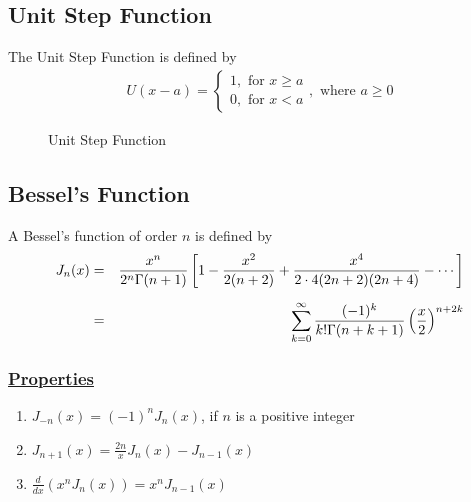 \documentclass[11pt]{report}
\newcommand{\ubt}[1]{\textbf{\underline{#1}}}
\newcommand{\sps}{\\[0.2cm]}
\newcommand{\dsp}{\displaystyle}
\newcommand{\properties}{\subsubsection{\ubt{Properties}}}
\renewcommand{\labelenumi}{\roman{enumi}.}
\begin{document}
	\subsection{Unit Step Function}
	The Unit Step Function is defined by
	\begin{eqnarray}
		U(x-a) = \left\{
			\begin{array}{l}
				1, \text{ for } x \geq a\\
				0, \text{ for } x < a
			\end{array}\right., \text{ where } a \geq 0 \label{eq:2_5}
	\end{eqnarray}
	
	\begin{figure}
		\centering
		\caption{Unit Step Function}\label{fig:2_1}
	\end{figure}

	\subsection{Bessel's Function}
	A Bessel's function of order $n$ is defined by
	\begin{eqnarray}
		J_n(x) &=& \frac{x^n}{2^n\Gamma(n+1)}\left[1 - \frac{x^2}{2(n+2)} + \frac{x^4}{2\cdot 4 (2n+2)(2n+4)} - \cdots \right]\notag\sps 
		&=& \sum_{k=0}^{\infty}\frac{(-1)^k}{k!\Gamma(n+k+1)}\left(\frac{x}{2}\right)^{n+2k} \label{eq:2_6}
	\end{eqnarray}
	
	\properties
	\begin{enumerate}
		\renewcommand{\labelenumi}{\roman{enumi}.}
		\item $\dsp J_{-n}(x) = (-1)^n J_n(x)$, if $n$ is a positive integer
		
		\item $\dsp J_{n+1}(x) = \frac{2n}{x}J_n(x) - J_{n-1}(x)$
		
		\item $\dsp \frac{d}{dx}\left(x^nJ_n(x)\right) = x^nJ_{n-1}(x)$
	\end{enumerate}
	
\end{document}
